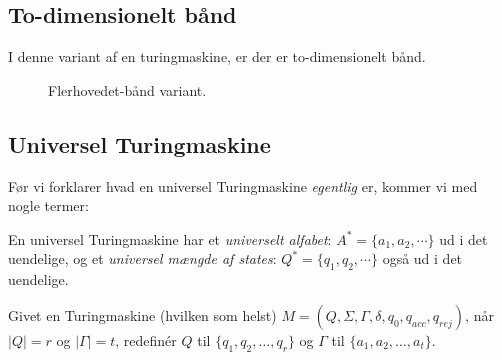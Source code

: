 \subsection{To-dimensionelt bånd}%
\label{subsec:todimensioneltbånd}

I denne variant af en turingmaskine, er der er to-dimensionelt bånd.

\begin{figure}[ht]
	\centering
	\caption{\label{fig:flerehoveder} Flerhovedet-bånd variant.}
\end{figure}

\subsection{Universel Turingmaskine}%
\label{subsec:universalturingmachine}

Før vi forklarer hvad en universel Turingmaskine \textit{egentlig }er, kommer vi med nogle termer:

En universel Turingmaskine har et \textit{universelt alfabet}: $A^{*} = \{a_{1}, a_{2}, \cdots\}$  ud i det uendelige, og et \textit{universel mængde af states}: $Q^{*} = \{q_{1}, q_{2}, \cdots\}$ også ud i det uendelige.

Givet en Turingmaskine (hvilken som helst) $M = (Q, \Sigma, \Gamma, \delta, q_{0}, q_{acc}, q_{rej})$, når $|Q| = r$ og $|\Gamma| = t$, redefinér $Q$ til $\{q_{1}, q_{2}, \ldots, q_{r}\}$ og $\Gamma$ til $\{a_{1}, a_{2}, \ldots, a_{t}\}$.

